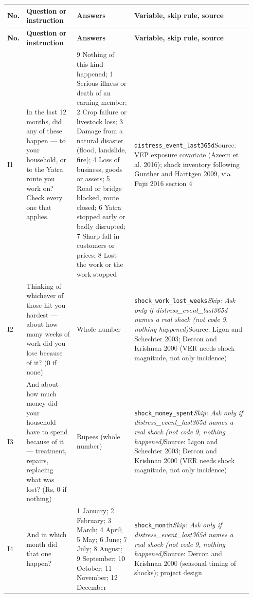 \documentclass[10pt]{article}
\begin{document}
{\scriptsize
\begin{longtable}{p{0.8cm}p{6.4cm}p{3.6cm}p{5.8cm}}
\toprule
\textbf{No.} & \textbf{Question or instruction} & \textbf{Answers} & \textbf{Variable, skip rule, source} \\
\midrule
\endfirsthead
\toprule
\textbf{No.} & \textbf{Question or instruction} & \textbf{Answers} & \textbf{Variable, skip rule, source} \\
\midrule
\endhead
I1 & In the last 12 months, did any of these happen — to your household, or to the Yatra route you work on? Check every one that applies. & 9 Nothing of this kind happened; 1 Serious illness or death of an earning member; 2 Crop failure or livestock loss; 3 Damage from a natural disaster (flood, landslide, fire); 4 Loss of business, goods or assets; 5 Road or bridge blocked, route closed; 6 Yatra stopped early or badly disrupted; 7 Sharp fall in customers or prices; 8 Lost the work or the work stopped & \texttt{distress\_event\_last365d}\newline Source: VEP exposure covariate (Azeem et al. 2016); shock inventory following Gunther and Harttgen 2009, via Fujii 2016 section 4 \\
I2 & Thinking of whichever of those hit you hardest — about how many weeks of work did you lose because of it? (0 if none) & Whole number & \texttt{shock\_work\_lost\_weeks}\newline \textit{Skip: Ask only if distress\_event\_last365d names a real shock (not code 9, nothing happened)}\newline Source: Ligon and Schechter 2003; Dercon and Krishnan 2000 (VER needs shock magnitude, not only incidence) \\
I3 & And about how much money did your household have to spend because of it — treatment, repairs, replacing what was lost? (Rs, 0 if nothing) & Rupees (whole number) & \texttt{shock\_money\_spent}\newline \textit{Skip: Ask only if distress\_event\_last365d names a real shock (not code 9, nothing happened)}\newline Source: Ligon and Schechter 2003; Dercon and Krishnan 2000 (VER needs shock magnitude, not only incidence) \\
I4 & And in which month did that one happen? & 1 January; 2 February; 3 March; 4 April; 5 May; 6 June; 7 July; 8 August; 9 September; 10 October; 11 November; 12 December & \texttt{shock\_month}\newline \textit{Skip: Ask only if distress\_event\_last365d names a real shock (not code 9, nothing happened)}\newline Source: Dercon and Krishnan 2000 (seasonal timing of shocks); project design \\

\end{longtable}}
\end{document}
